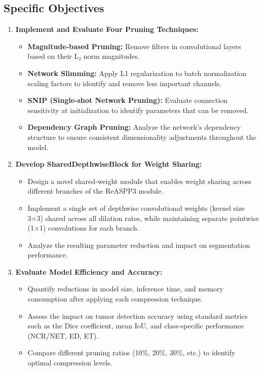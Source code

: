 \documentclass[conference]{IEEEtran}
\begin{document}
\subsection{Specific Objectives}
\begin{enumerate}[label=\textbf{\arabic*.}]
    \item \textbf{Implement and Evaluate Four Pruning Techniques:}
    \begin{itemize}[label=--]
        \item \textbf{Magnitude-based Pruning:} Remove filters in convolutional layers based on their L₂ norm magnitudes.
        \item \textbf{Network Slimming:} Apply L1 regularization to batch normalization scaling factors to identify and remove less important channels.
        \item \textbf{SNIP (Single-shot Network Pruning):} Evaluate connection sensitivity at initialization to identify parameters that can be removed.
        \item \textbf{Dependency Graph Pruning:} Analyze the network's dependency structure to ensure consistent dimensionality adjustments throughout the model.
    \end{itemize}

    \item \textbf{Develop SharedDepthwiseBlock for Weight Sharing:}
    \begin{itemize}[label=--]
        \item Design a novel shared-weight module that enables weight sharing across different branches of the ReASPP3 module.
        \item Implement a single set of depthwise convolutional weights (kernel size 3×3) shared across all dilation rates, while maintaining separate pointwise (1×1) convolutions for each branch.
        \item Analyze the resulting parameter reduction and impact on segmentation performance.
    \end{itemize}
    
    \item \textbf{Evaluate Model Efficiency and Accuracy:}
    \begin{itemize}[label=--]
        \item Quantify reductions in model size, inference time, and memory consumption after applying each compression technique.
        \item Assess the impact on tumor detection accuracy using standard metrics such as the Dice coefficient, mean IoU, and class-specific performance (NCR/NET, ED, ET).
        \item Compare different pruning ratios (10\%, 20\%, 30\%, etc.) to identify optimal compression levels.
    \end{itemize}
    

\end{enumerate}
\end{document}
